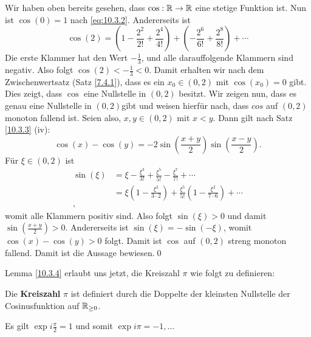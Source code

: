 \begin{subproof*}
	Wir haben oben bereits gesehen, dass $ \cos : \mathbb{R} \to \mathbb{R}  $ eine stetige Funktion ist. Nun ist $ \cos (0) = 1 $ nach \eqref{eq:10.3.2}. Andererseits ist
	\[
		\cos (2) = \left( 1 - \frac{ 2^2 }{ 2! } + \frac{ 2^4 }{ 4! }  \right) + \left( - \frac{ 2^6 }{ 6! } + \frac{ 2^8 }{ 8! }  \right) + \dotsb
	\]
	Die erste Klammer hat den Wert $ - \frac{ 1 }{ 3 }  $, und alle darauffolgende Klammern sind negativ.
	Also folgt $ \cos (2) < - \frac{ 1 }{ 3 } < 0 $. Damit erhalten wir nach dem Zwischenwertsatz (Satz \ref{7.4.1}), dass es ein $ x_0 \in (0, 2) $ mit $ \cos (x_0) = 0 $ gibt. Dies zeigt, dass $ \cos  $ eine Nullstelle in $ (0, 2) $ besitzt. Wir zeigen nun, dass es genau eine Nullstelle in $ (0,2) $gibt und weisen hierfür nach, dass $ cos $ auf $ (0, 2) $ monoton fallend ist. Seien also, $ x, y \in (0, 2) $ mit $ x < y $. Dann gilt nach Satz \ref{10.3.3} (iv):
	\[
		\cos (x) - \cos (y) = -2 \sin \left(  \frac{ x + y }{ 2 } \right) \sin \left( \frac{ x - y }{ 2 }  \right).
	\]
	Für $ \xi \in (0,2) $ ist
	\begin{align*}
		\sin (\xi) &= \xi - \frac{\xi^3}{ 3! } + \frac{ \xi^5 }{ 5! } - \frac{ \xi^7 }{ 7! } + \dotsb \\
		~&= \xi \left( 1- \frac{\xi^2}{ 3 \cdot 2 } \right) + \frac{ \xi^5}{ 5! } \left( 1 - \frac{ \xi^2 }{ 7 \cdot 6 }  \right) + \dotsb \\,
	\end{align*}
	womit alle Klammern positiv sind. Also folgt $ \sin (\xi) > 0 $ und damit $ \sin \left( \frac{ x + y }{ 2 }  \right) > 0 $. Andererseits ist $ \sin (\xi) = - \sin ( -\xi) $, womit $ \cos (x) - \cos (y) > 0 $ folgt. Damit ist $ \cos  $ auf $ (0, 2) $ streng monoton fallend. Damit ist die Aussage bewiesen.\qed
\end{subproof*}

Lemma \ref{10.3.4} erlaubt uns jetzt, die Kreiszahl $ \pi  $ wie folgt zu definieren:

\begin{subdefinition}[Kreiszahl $ pi $]
	Die \textbf{Kreiszahl} $ \pi  $ ist definiert durch die Doppelte der kleinsten Nullstelle der Cosinusfunktion auf $ \mathbb{R}_{\geq 0}  $.
\end{subdefinition}

\begin{subtheorem}
	Es gilt $ \exp i \frac{ \pi }{ 2 } = 1 $ und somit $ \exp i \pi = -1, \dotsc $
\end{subtheorem}

